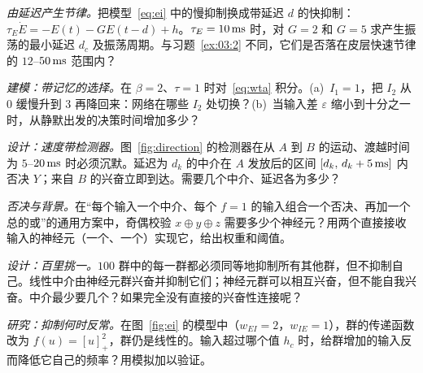 \begin{exercise}[\lvlB]
\label{ex:03:3}
\emph{由延迟产生节律。}把模型~\eqref{eq:ei} 中的慢抑制换成带延迟 $d$ 的快抑制：$\tau_E\dot E=-E(t)-GE(t-d)+h$。$\tau_E=10\,\text{ms}$ 时，对 $G=2$ 和 $G=5$ 求产生振荡的最小延迟 $d_c$ 及振荡周期。与习题~\ref{ex:03:2} 不同，它们是否落在皮层快速节律的 $12$--$50\,\text{ms}$ 范围内？
\end{exercise}

\begin{exercise}[\lvlB]
\label{ex:03:4}
\emph{建模：带记忆的选择。}在 $\beta=2$、$\tau=1$ 时对~\eqref{eq:wta} 积分。(a)~$I_1=1$，把 $I_2$ 从 $0$ 缓慢升到 $3$ 再降回来：网络在哪些 $I_2$ 处切换？(b)~当输入差 $\varepsilon$ 缩小到十分之一时，从静默出发的决策时间增加多少？
\end{exercise}

\begin{exercise}[\lvlB]
\label{ex:03:5}
\emph{设计：速度带检测器。}图~\ref{fig:direction} 的检测器在从 $A$ 到 $B$ 的运动、渡越时间为 $5$--$20\,\text{ms}$ 时必须沉默。延迟为 $d_k$ 的中介在 $A$ 发放后的区间 $[d_k,\,d_k+5\,\text{ms}]$ 内否决 $Y$；来自 $B$ 的兴奋立即到达。需要几个中介、延迟各为多少？
\end{exercise}

\begin{exercise}[\lvlB]
\label{ex:03:6}
\emph{否决与背景。}在“每个输入一个中介、每个 $f=1$ 的输入组合一个否决、再加一个总的或”的通用方案中，奇偶校验 $x\oplus y\oplus z$ 需要多少个神经元？用两个直接接收输入的神经元（一个、一个）实现它，给出权重和阈值。
\end{exercise}

\begin{exercise}[\lvlC]
\label{ex:03:7}
\emph{设计：百里挑一。}$100$ 群中的每一群都必须同等地抑制所有其他群，但不抑制自己。线性中介由神经元群兴奋并抑制它们；神经元群可以相互兴奋，但不能自我兴奋。中介最少要几个？如果完全没有直接的兴奋性连接呢？
\end{exercise}

\begin{exercise}[\lvlC]
\label{ex:03:8}
\emph{研究：抑制何时反常。}在图~\ref{fig:ei} 的模型中（$w_{EI}=2$，$w_{IE}=1$），群的传递函数改为 $f(u)=[u]_+^2$，群仍是线性的。输入超过哪个值 $h_c$ 时，给群增加的输入反而降低它自己的频率？用模拟加以验证。
\end{exercise}
